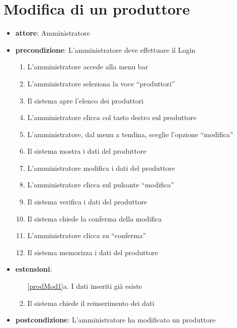 \section{Modifica di un produttore}
\begin{itemize}
	\item \textbf{attore}: Amministratore
	\item \textbf{precondizione}: L’amministratore deve effettuare il Login

	\begin{enumerate}
		\item L’amministratore accede alla menu bar
		\item L’amministratore seleziona la voce “produttori”
		\item Il sistema apre l’elenco dei produttori
		\item L’amministratore clicca col tasto destro sul produttore
		\item L’amministratore, dal menu a tendina, sceglie l’opzione “modifica”
		\item Il sistema mostra i dati del produttore
		\item L’amministratore modifica i dati del produttore
		\item L’amministratore clicca sul pulsante “modifica”
		\label{prodMod1}
		\item Il sistema verifica i dati del produttore
		\item Il sistema chiede la conferma della modifica
		\item L’amministratore clicca su “conferma”
		\item Il sistema memorizza i dati del produttore
	\end{enumerate}

	\item \textbf{estensioni}:
	\begin{enumerate}
		\item[\ref{prodMod1}a.] I dati inseriti già esiste
		\item Il sistema chiede il reinserimento dei dati
	\end{enumerate}

	\item \textbf{postcondizione}: L’amministratore ha modificato un produttore
\end{itemize}
		

